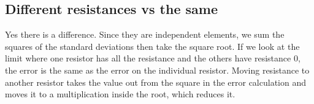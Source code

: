 \subsection{Different resistances vs the same}
Yes there is a difference. Since they are independent elements, we sum the squares of the standard deviations then take the square root. If we look at the limit where one resistor has all the resistance and the others have resistance 0, the error is the same as the error on the individual resistor. Moving resistance to another resistor takes the value out from the square in the error calculation and moves it to a multiplication inside the root, which reduces it.